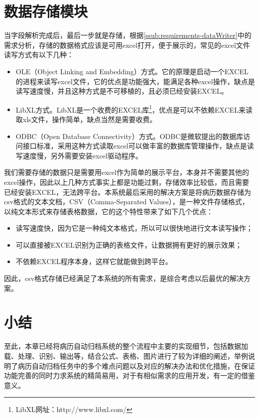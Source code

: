 \section{数据存储模块} %
当字段解析完成后，最后一步就是存储，根据\autoref{ssub:requirements-dataWriter}中的需求分析，存储的数据格式应该是可用excel打开，便于展示的，常见的excel文件读写方式有以下几种：
\begin{itemize}
	\item OLE（Object Linking and Embedding）方式。它的原理是启动一个EXCEL的进程来读写excel文件，它的优点是功能强大，能满足各种excel操作，缺点是读写速度慢，并且这种方式是不可移植的，且必须已经安装EXCEL。
	\item LibXL方式。LibXL是一个收费的EXCEL库\footnote{LibXL网址：http://www.libxl.com/}，优点是可以不依赖EXCEL来读取xls文件，操作简单，缺点当然是需要收费。
	\item ODBC（Open Database Connectivity）方式。ODBC是微软提出的数据库访问接口标准，采用这种方式读取excel可以做丰富的数据库管理操作，缺点是读写速度慢，另外需要安装excel驱动程序。
\end{itemize}
我们需要存储的数据只是需要用excel作为简单的展示平台，本身并不需要其他的excel操作，因此以上几种方式事实上都是功能过剩，存储效率比较低，而且需要已经安装EXCEL，无法跨平台。本系统最后采用的解决方案是将病历数据存储为csv格式的文本文档，CSV（Comma-Separated Values），是一种文件存储格式，以纯文本形式来存储表格数据，它的这个特性带来了如下几个优点：
\begin{itemize}
	\item 读写速度快，因为它是一种纯文本格式，所以可以很快地进行文本读写操作；
	\item 可以直接被EXCEL识别为正确的表格文件，让数据拥有更好的展示效果；
	\item 不依赖EXCEL程序本身，这样它就能做到跨平台。
\end{itemize}
因此，csv格式存储已经满足了本系统的所有需求，是综合考虑以后最优的解决方案。

\section{小结}
至此，本章已经将病历自动归档系统的整个流程中主要的实现细节，包括数据加载、处理、识别、输出等，结合公式、表格、图片进行了较为详细的阐述，举例说明了病历自动归档任务中的多个难点问题以及对应的解决办法和优化措施，在保证功能完善的同时力求系统的精简易用，对于有相似需求的应用开发，有一定的借鉴意义。
